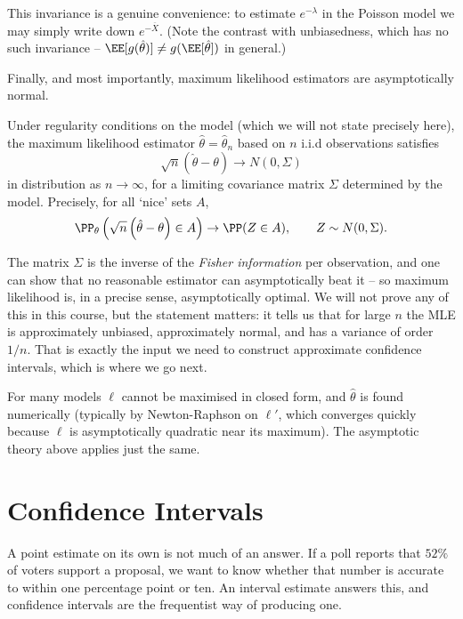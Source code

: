 This invariance is a genuine convenience: to estimate $e^{-\lambda}$ in the Poisson model we may simply write down $e^{-\overline{X}}$. (Note the contrast with unbiasedness, which has no such invariance -- $\EE[g(\hat\theta)] \neq g(\EE[\hat\theta])$ in general.)

Finally, and most importantly, maximum likelihood estimators are asymptotically normal.

\begin{fact}
  Under regularity conditions on the model (which we will not state precisely here), the maximum likelihood estimator $\hat\theta = \hat\theta_n$ based on $n$ i.i.d observations satisfies
  $$
  \sqrt{n}\left(\hat\theta - \theta\right) \to N(0, \Sigma)
  $$
  in distribution as $n \to \infty$, for a limiting covariance matrix $\Sigma$ determined by the model. Precisely, for all `nice' sets $A$,
  $$
  \PP_\theta\left(\sqrt{n}\left(\hat\theta - \theta\right) \in A\right) \to \PP(Z \in A), \qquad Z \sim N(0,\Sigma).
  $$
\end{fact}

The matrix $\Sigma$ is the inverse of the \emph{Fisher information} per observation, and one can show that no reasonable estimator can asymptotically beat it -- so maximum likelihood is, in a precise sense, asymptotically optimal. We will not prove any of this in this course, but the statement matters: it tells us that for large $n$ the MLE is approximately unbiased, approximately normal, and has a variance of order $1/n$. That is exactly the input we need to construct approximate confidence intervals, which is where we go next.

\begin{remark}
  For many models $\ell$ cannot be maximised in closed form, and $\hat\theta$ is found numerically (typically by Newton-Raphson on $\ell'$, which converges quickly because $\ell$ is asymptotically quadratic near its maximum). The asymptotic theory above applies just the same.
\end{remark}


\section{Confidence Intervals}

A point estimate on its own is not much of an answer. If a poll reports that $52\%$ of voters support a proposal, we want to know whether that number is accurate to within one percentage point or ten. An interval estimate answers this, and confidence intervals are the frequentist way of producing one.


